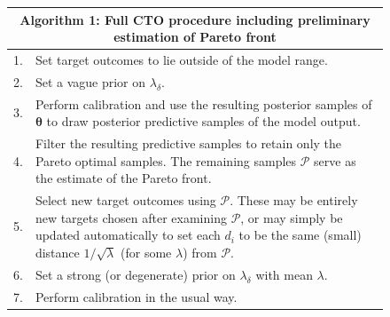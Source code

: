 \documentclass[12pt]{article}
\begin{document}
\begin{figure}
\centering
\begin{tabular}{|l|p{5.5in}|}
\hline
\multicolumn{2}{|c|}{Algorithm 1: Full CTO procedure including preliminary estimation of Pareto front}\\
\hline
1.&Set target outcomes to lie outside of the model range.\\
2.&  Set a vague prior on $\lambda_\delta$.\\
3.&  Perform calibration and use the resulting posterior samples of $\boldsymbol\theta$ to draw posterior predictive samples of the model output.\\
4.&  Filter the resulting predictive samples to retain only the Pareto optimal samples. The remaining samples $\mathcal P$ serve as the estimate of the Pareto front.\\
5.& Select new target outcomes using $\mathcal P$. These may be entirely new targets chosen after examining $\mathcal P$, or may simply be updated automatically to set each $d_i$ to be the same (small) distance $1/\sqrt{\lambda}$ (for some $\lambda$) from $\mathcal P$.\\
6.& Set a strong (or degenerate) prior on $\lambda_\delta$ with mean $\lambda$.\\
7.& Perform calibration in the usual way.\\
\hline
\end{tabular}
\label{alg:CDO_alg}
\end{figure}
\end{document}
